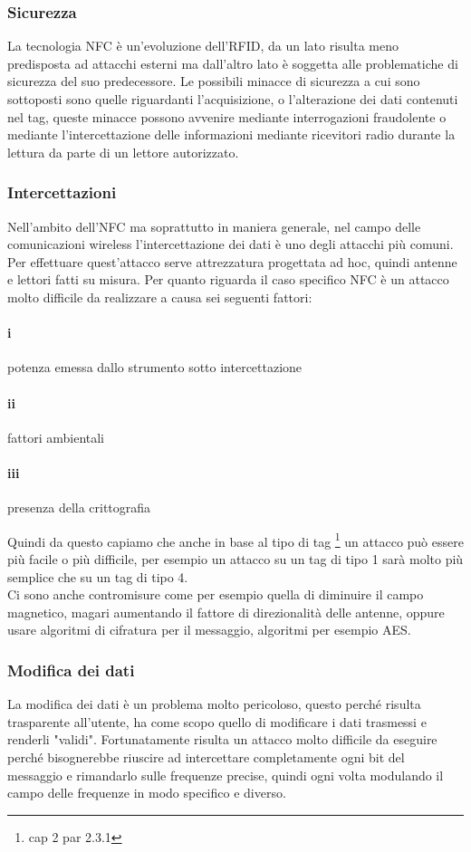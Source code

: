 \subsubsection{Sicurezza}
\hspace{\parindent}La tecnologia NFC è un'evoluzione dell'RFID, da un lato risulta meno predisposta ad attacchi esterni ma dall'altro lato è soggetta alle problematiche di sicurezza del suo predecessore. Le possibili minacce di sicurezza a cui sono sottoposti sono quelle riguardanti l'acquisizione, o l'alterazione dei dati contenuti nel tag, queste minacce possono avvenire mediante interrogazioni fraudolente o mediante l'intercettazione delle informazioni mediante ricevitori radio durante la lettura da parte di un lettore autorizzato.
\subsubsection{Intercettazioni}
\hspace{\parindent}Nell'ambito dell'NFC ma soprattutto in maniera generale, nel campo delle comunicazioni wireless l'intercettazione dei dati è uno degli attacchi più comuni. Per effettuare quest'attacco serve attrezzatura progettata ad hoc, quindi antenne e lettori fatti su misura. Per quanto riguarda il caso specifico NFC è un attacco molto difficile da realizzare a causa sei seguenti fattori:
\paragraph{i} potenza emessa dallo strumento sotto intercettazione
\paragraph{ii} fattori ambientali
\paragraph{iii} presenza della crittografia

Quindi da questo capiamo che anche in base al tipo di tag \footnote{cap 2 par 2.3.1} un attacco può essere più facile o più difficile, per esempio un attacco su un tag di tipo 1 sarà molto più semplice che su un tag di tipo 4.
\\Ci sono anche contromisure come per esempio quella di diminuire il campo magnetico, magari aumentando il fattore di direzionalità delle antenne, oppure usare algoritmi di cifratura per il messaggio, algoritmi per esempio AES.
\subsubsection{Modifica dei dati}
\hspace{\parindent}La modifica dei dati è un problema molto pericoloso, questo perché risulta trasparente all'utente, ha come scopo quello di modificare i dati trasmessi e renderli "validi". Fortunatamente risulta un attacco molto difficile da eseguire perché bisognerebbe riuscire ad intercettare completamente ogni bit del messaggio e rimandarlo sulle frequenze precise, quindi ogni volta modulando il campo delle frequenze in modo specifico e diverso.
